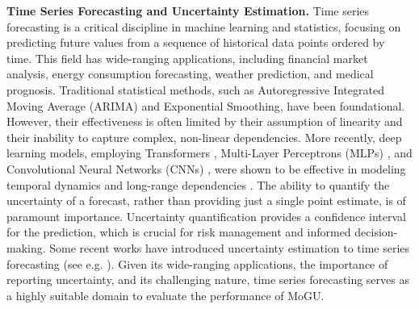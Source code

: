 \textbf{Time Series Forecasting and Uncertainty Estimation.} Time series forecasting is a critical discipline in machine learning and statistics, focusing on predicting future values from a sequence of historical data points ordered by time. This field has wide-ranging applications, including financial market analysis, energy consumption forecasting, weather prediction, and medical prognosis. Traditional statistical methods, such as Autoregressive Integrated Moving Average (ARIMA) and Exponential Smoothing, have been foundational. However, their effectiveness is often limited by their assumption of linearity and their inability to capture complex, non-linear dependencies. More recently, deep learning models, employing  Transformers \cite{Yuqietal-2023-PatchTST,autoformer,reformer}, Multi-Layer Perceptrons (MLPs) \cite{wang2024timemixer, dlinear}, and Convolutional Neural Networks (CNNs) \cite{wu2023timesnet,wang2024timemixer}, were shown to be effective in modeling temporal dynamics and long-range dependencies \cite{wang2024deep,time_series_survey,xwang2024deep,wang2024timemixer}. The ability to quantify the uncertainty of a forecast, rather than providing just a single point estimate, is of paramount importance.  Uncertainty quantification provides a confidence interval for the prediction, which is crucial for risk management and informed decision-making. Some recent works have introduced uncertainty estimation to time series forecasting (see e.g. \cite{cini2025corel, wu2025eci}).
Given its wide-ranging applications, the importance of reporting uncertainty, and its challenging nature, time series forecasting serves as a highly suitable domain to evaluate the performance of MoGU. 

